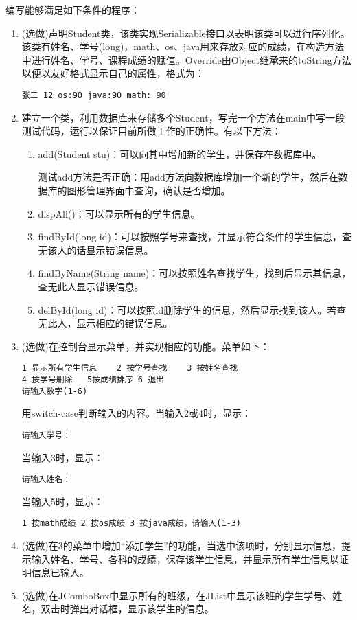 ﻿\documentclass[cs5size,b5paper,nofonts,twoside]{ctexart}
\begin{document}
编写能够满足如下条件的程序：
\begin{enumerate}
\item (选做)声明Student类，该类实现Serializable接口以表明该类可以进行序列化。该类有姓名、学号(long)，math、os、java用来存放对应的成绩，在构造方法中进行姓名、学号、课程成绩的赋值。Override由Object继承来的toString方法以便以友好格式显示自己的属性，格式为：
     \begin{verbatim}张三 12 os:90 java:90 math: 90 \end{verbatim}
\item 建立一个类，利用数据库来存储多个Student，写完一个方法在main中写一段测试代码，运行以保证目前所做工作的正确性。有以下方法：
\begin{enumerate}
     \item add(Student stu)：可以向其中增加新的学生，并保存在数据库中。

	 测试add方法是否正确：用add方法向数据库增加一个新的学生，然后在数据库的图形管理界面中查询，确认是否增加。
     \item dispAll()：可以显示所有的学生信息。
     \item findById(long id)：可以按照学号来查找，并显示符合条件的学生信息，查无该人的话显示错误信息。
     \item findByName(String name)：可以按照姓名查找学生，找到后显示其信息，查无此人显示错误信息。
     \item delById(long id)：可以按照id删除学生的信息，然后显示找到该人。若查无此人，显示相应的错误信息。
\end{enumerate}
\item (选做)在控制台显示菜单，并实现相应的功能。菜单如下：
   \begin{verbatim}1 显示所有学生信息    2 按学号查找    3 按姓名查找
4 按学号删除   5按成绩排序 6 退出
请输入数字(1-6)\end{verbatim}
   用switch-case判断输入的内容。当输入2或4时，显示：
      \begin{verbatim}请输入学号：\end{verbatim}
   当输入3时，显示：
      \begin{verbatim}请输入姓名：\end{verbatim}
   当输入5时，显示：
      \begin{verbatim}1 按math成绩 2 按os成绩 3 按java成绩，请输入(1-3)\end{verbatim}
\item (选做)在3的菜单中增加“添加学生”的功能，当选中该项时，分别显示信息，提示输入姓名、学号、各科的成绩，保存该学生信息，并显示所有学生信息以证明信息已输入。
\item (选做)在JComboBox中显示所有的班级，在JList中显示该班的学生学号、姓名，双击时弹出对话框，显示该学生的信息。
\end{enumerate}
\end{document}
